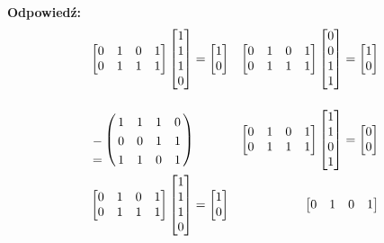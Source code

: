 \documentclass[a4paper,12pt]{article}
\theoremstyle{definition}%
\theoremstyle{definition}
\theoremstyle{problem}
\let\bbordermatrix\bordermatrix
\begin{document}
\begin{enumerate}[label=\alph*)]
\textbf{Odpowiedź: }
\begin{align*}
&\begin{bmatrix}
0& 1& 0& 1\\
0& 1& 1& 1 
\end{bmatrix}\begin{bmatrix}
1\\1\\1\\0
\end{bmatrix}=\begin{bmatrix}
1\\0
\end{bmatrix} & \begin{bmatrix}
0& 1& 0& 1\\
0& 1& 1& 1 
\end{bmatrix}\begin{bmatrix}
0\\0\\1\\1
\end{bmatrix}=\begin{bmatrix}
1\\0
\end{bmatrix}\\
&\bbordermatrix{
&&&&\cr
& 1 & 1 & 1 & 0\cr
-& 0 & 0 & 1 & 1\cr
=& 1 & 1 & 0 & 1
}& \begin{bmatrix}
0& 1& 0& 1\\
0& 1& 1& 1 
\end{bmatrix}\begin{bmatrix}
1\\1\\0\\1
\end{bmatrix}=\begin{bmatrix}
0\\0
\end{bmatrix}\\
&\begin{bmatrix}
0& 1& 0& 1\\
0& 1& 1& 1 
\end{bmatrix}\begin{bmatrix}
1\\1\\1\\0
\end{bmatrix}=\begin{bmatrix}
1\\0
\end{bmatrix} & \begin{bmatrix}
0& 1& 0& 1\\

\end{bmatrix}
\end{align*}
\end{enumerate}
\end{document}
